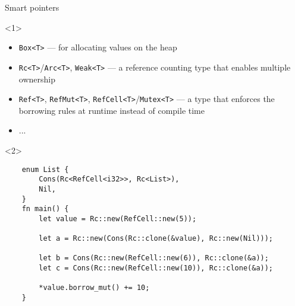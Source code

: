 \begin{frame}[fragile]{Smart pointers}
  \begin{onlyenv}<1>
  \begin{itemize}
  \item \texttt{Box<T>} --- for allocating values on the heap
  \item \texttt{Rc<T>}/\texttt{Arc<T>}, \texttt{Weak<T>} --- a reference
    counting type that enables multiple ownership
  \item \texttt{Ref<T>}, \texttt{RefMut<T>},
    \texttt{RefCell<T>}/\texttt{Mutex<T>} --- a type that enforces the borrowing
    rules at runtime instead of compile time
  \item ...
  \end{itemize}
  \end{onlyenv}

  \begin{onlyenv}<2>
    \begin{verbatim}
    enum List {
        Cons(Rc<RefCell<i32>>, Rc<List>),
        Nil,
    }
    fn main() {
        let value = Rc::new(RefCell::new(5));

        let a = Rc::new(Cons(Rc::clone(&value), Rc::new(Nil)));

        let b = Cons(Rc::new(RefCell::new(6)), Rc::clone(&a));
        let c = Cons(Rc::new(RefCell::new(10)), Rc::clone(&a));

        *value.borrow_mut() += 10;
    }
    \end{verbatim}
  \end{onlyenv}
\end{frame}
